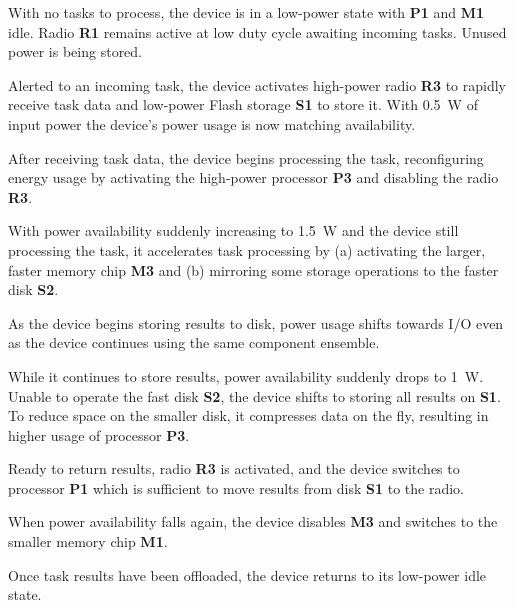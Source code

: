 \begin{timeenum}

\item With no tasks to process, the device is in a low-power state with
\textbf{P1} and \textbf{M1} idle. Radio \textbf{R1} remains active at low
duty cycle awaiting incoming tasks. Unused power is being stored.

\item Alerted to an incoming task, the device activates high-power radio
\textbf{R3} to rapidly receive task data and low-power Flash storage
\textbf{S1} to store it. With 0.5~W of input power the device's power usage
is now matching availability.

\item After receiving task data, the device begins processing the task,
reconfiguring energy usage by activating the high-power processor \textbf{P3}
and disabling the radio \textbf{R3}.

\item With power availability suddenly increasing to 1.5~W and the device
still processing the task, it accelerates task processing by (a) activating
the larger, faster memory chip \textbf{M3} and (b) mirroring some storage
operations to the faster disk \textbf{S2}.

\item As the device begins storing results to disk, power usage shifts
towards I/O even as the device continues using the same component ensemble.

\item While it continues to store results, power availability suddenly drops
to 1~W. Unable to operate the fast disk \textbf{S2}, the device shifts to
storing all results on \textbf{S1}. To reduce space on the smaller disk, it
compresses data on the fly, resulting in higher usage of processor
\textbf{P3}.

\item Ready to return results, radio \textbf{R3} is activated, and the device
switches to processor \textbf{P1} which is sufficient to move results from
disk \textbf{S1} to the radio.

\item When power availability falls again, the device
disables \textbf{M3} and switches to the smaller memory chip \textbf{M1}.

\item Once task results have been offloaded, the device returns to its
low-power idle state.

\end{timeenum}

